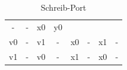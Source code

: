 \begin{table}[htbp]
\begin{minipage}{\textwidth}
\begin{tabular}{cccccccc}
		\multicolumn{1}{|c}{-} & \multicolumn{1}{c}{-} & \multicolumn{1}{c}{x0} &  \multicolumn{1}{c}{y0} \\
		\multicolumn{1}{c}{v0} & \multicolumn{1}{c}{-} &
		\multicolumn{1}{c}{v1} & \multicolumn{1}{c}{-} &
		\multicolumn{1}{|c}{x0} & \multicolumn{1}{c}{-} & \multicolumn{1}{c}{x1} &  \multicolumn{1}{c}{-} \\
		\multicolumn{1}{c}{v1} & \multicolumn{1}{c}{-} &
		\multicolumn{1}{c}{v0} & \multicolumn{1}{c}{-} &
		\multicolumn{1}{|c}{x1} & \multicolumn{1}{c}{-} & \multicolumn{1}{c}{x0} &  \multicolumn{1}{c}{-}                
	\end{tabular}
	\caption{\label{fig::schreib-port}Schreib-Port}
	\end{minipage}
	
	
	

\end{table}
